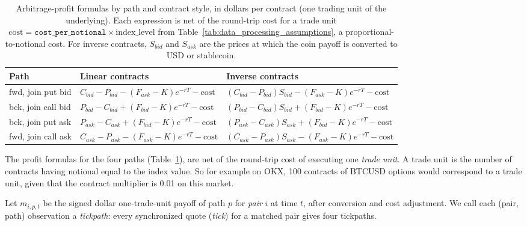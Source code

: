 \documentclass[12pt]{article}
\begin{document}
\begin{table}[htbp]
    \centering
    \footnotesize
    \caption{Arbitrage-profit formulas by path and contract style, in dollars per contract (one trading unit of the underlying). Each expression is net of the round-trip cost for a trade unit $\mathrm{cost}=\texttt{cost\_per\_notional}\times\mathrm{index\_level}$ from Table~\ref{tab:data_processing_assumptions}, a proportional-to-notional cost. For inverse contracts, $S_{bid}$ and $S_{ask}$ are the prices at which the coin payoff is converted to USD or stablecoin.}
    \label{tab:arbitrage_eight_formulas}
    \setlength{\tabcolsep}{3pt}
    \begin{tabularx}{0.98\textwidth}{@{}>{\RaggedRight\arraybackslash}p{}>{\RaggedRight\arraybackslash}p{}>{\RaggedRight\arraybackslash}p{}@{}}
    \toprule
    Path & Linear contracts & Inverse contracts \\
    \midrule
    fwd, join put bid &
    $C_{bid}-P_{bid}-(F_{ask}-K)e^{-rT}-\mathrm{cost}$ &
    $(C_{bid}-P_{bid})S_{bid}-(F_{ask}-K)e^{-rT}-\mathrm{cost}$ \\
        bck, join call bid &
    $P_{bid}-C_{bid}+(F_{bid}-K)e^{-rT}-\mathrm{cost}$ &
    $(P_{bid}-C_{bid})S_{bid}+(F_{bid}-K)e^{-rT}-\mathrm{cost}$ \\
        bck, join put ask &
    $P_{ask}-C_{ask}+(F_{bid}-K)e^{-rT}-\mathrm{cost}$ &
    $(P_{ask}-C_{ask})S_{ask}+(F_{bid}-K)e^{-rT}-\mathrm{cost}$ \\
        fwd, join call ask &
    $C_{ask}-P_{ask}-(F_{ask}-K)e^{-rT}-\mathrm{cost}$ &
    $(C_{ask}-P_{ask})S_{ask}-(F_{ask}-K)e^{-rT}-\mathrm{cost}$ \\
    \bottomrule
    \end{tabularx}
\end{table}

The profit formulas for the four paths (Table~\ref{tab:arbitrage_eight_formulas}), are net of the round-trip cost of executing one \emph{trade unit}. A trade unit is the number of contracts having notional equal to the index value. So for example on OKX, 100 contracts of BTCUSD options would correspond to a trade unit, given that the contract multiplier is 0.01 on this market.

Let $m_{i,p,t}$ be the signed dollar one-trade-unit payoff of path $p$ for \emph{pair} $i$ at time $t$, after conversion and cost adjustment. We call each (pair, path) observation a \emph{tickpath}: every synchronized quote (\emph{tick}) for a matched pair gives four tickpaths.
\end{document}
